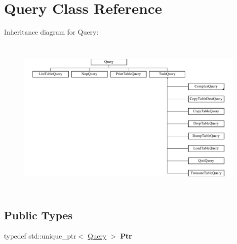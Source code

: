 \hypertarget{class_query}{}\section{Query Class Reference}
\label{class_query}
Inheritance diagram for Query\+:\begin{figure}[H]
\begin{center}
\leavevmode
\includegraphics[height=7.887324cm]{class_query}
\end{center}
\end{figure}
\subsection*{Public Types}
\begin{DoxyCompactItemize}
\item 
\mbox{\label{class_query_a0a0a7f0fc1097f196ecd56a44baec036}} 
typedef std\+::unique\+\_\+ptr$<$ \hyperlink{class_query}{Query} $>$ {\bfseries Ptr}
\end{DoxyCompactItemize}
